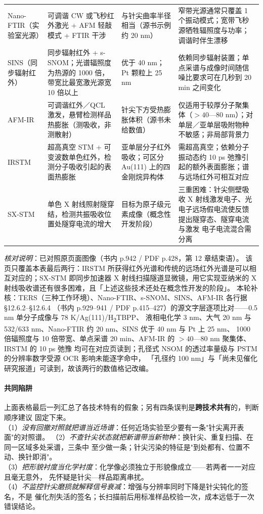 {\begin{longtable}{@{}p{24mm}p{42mm}p{32mm}p{48mm}@{}}
Nano-FTIR（实验室光源） & 可调谐 CW 或飞秒红外激光 + AFM 轻敲模式 + FTIR 干涉 &
与针尖曲率半径相当（源书示例约 20 nm） &
窄带光源通常只覆盖 1 个振动模式；宽带飞秒源牺牲辐照度与功率；调谐时伴生漂移 \\
SINS（同步辐射红外） & 同步辐射红外 + s-SNOM；光谱辐照度为热源的 1000 倍，带宽比最宽激光源宽 10 倍以上 &
优于 40 nm；Pt 颗粒上 25 nm &
依赖同步辐射装置；单点采谱与成像时间随信噪比要求可在几秒到 20 min 之间变化 \\
AFM-IR & 可调谐红外／QCL 激发，悬臂检测样品热膨胀（测吸收，非测散射） &
针尖下方受热膨胀体积（源书未给数值） &
仅适用于较厚分子聚集体（$>40$—80 nm）；对单层／亚单层吸附物种不敏感；非局部背景力 \\
IRSTM & 超高真空 STM + 可变波数单色红外，检测分子吸收引起的表面热膨胀 &
亚单层分子红外吸收；可区分 Au(111) 上的四金刚烷异构体 &
需超高真空；依赖分子振动态约 10 ps 弛豫引起的额外表面膨胀；谱与远场红外可相互对应 \\
SX-STM & 单色 X 射线照射隧穿结，检测共振吸收位置处隧穿电流的增大 &
目标为原子级元素成像（概念性开发阶段） &
三重困难：针尖侧壁吸收 X 射线激发电子、光电子远场假电流使反馈提出隧穿态、隧穿电流与激发
电子电流混合需分离 \\
\end{longtable}
}
\emph{核对说明}：已对照原页面图像（书内 p.942 / PDF p.428，第 12 章结束语）。
该页只覆盖本表最后两行：IRSTM 所获得红外光谱和传统的远场红外光谱是可以相互对应的；SX-STM 即同步加速器
X 射线扫描隧道显微镜，用它实现亚纳米的 X 射线吸收谱还有很多困难，且「上述这些技术还处在概念性开发的阶段」。
本轮补核：TERS（三种工作环境）、Nano-FTIR、s-SNOM、SINS、AFM-IR 各行据 §12.6.2--§12.6.4
（书内 p.929--941 / PDF p.415--427）的源文字层逐项比对——0.5 nm 单分子成像与 78 K/Ag(111)/H\textsubscript{2}TBPP、
液相电化学 3 nm、大气 20 nm 与 532/633 nm、Nano-FTIR 约 20 nm、SINS 优于 40 nm 与 Pt 上 25 nm、
1000 倍辐照度与 10 倍带宽、单点采谱 20 min、AFM-IR 的 $>40$—80 nm 聚集体、IRSTM 的 10 ps 弛豫
均可在对应页读到；孔径式 NSOM 的透过率量级与 PSTM 的分辨率数字受源 OCR 影响未能逐字命中，
「孔径约 100 nm」与「尚未见催化研究报道」可读到，故该两行的数值格记改编。

\paragraph{共同陷阱}
上面表格最后一列汇总了各技术特有的假象；另有四条误判是\textbf{跨技术共有}的，判断顺序建议
固定下来。\\
（1）\emph{没有回撤对照就把谱当近场谱}：任何近场实验至少要有一条"针尖离开表面"的对照谱。
（2）\emph{不查针尖状态就把新谱带当新物种}：换针尖、重复扫描、在同一区域多处采谱，三条中
至少做一条；针尖污染的特征是"到处都有、位置不动、换针即消"。\\
（3）\emph{把形貌衬度当化学衬度}：化学像必须独立于形貌像成立——若两者一一对应且毫无意外，
先怀疑是针尖—样品距离串扰。\\
（4）\emph{不监控针尖磨损就解释信号衰减}：增强与分辨率同时下降是针尖钝化的签名，不是
催化剂失活的签名；长扫描前后用标准样品校验一次，成本远低于一次错误结论。

